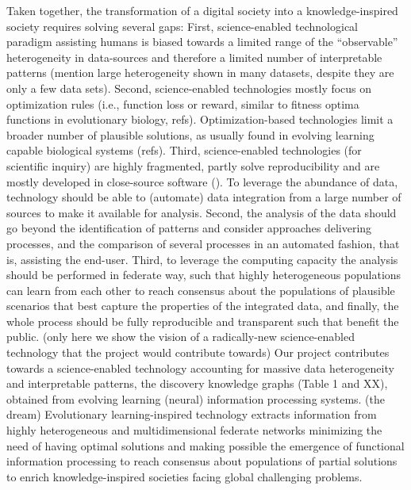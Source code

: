 \documentclass[11pt, a4paper]{article} %
\begin{document}
Taken together, the transformation of a digital society into a
knowledge-inspired society requires solving several gaps: First,
science-enabled technological paradigm assisting humans is biased
towards a limited range of the ``observable'' heterogeneity in
data-sources and therefore a limited number of interpretable patterns
(mention large heterogeneity shown in many datasets, despite they are
only a few data sets). Second, science-enabled technologies mostly
focus on optimization rules (i.e., function loss or reward, similar to
fitness optima functions in evolutionary biology,
refs). Optimization-based technologies limit a broader number of
plausible solutions, as usually found in evolving learning capable
biological systems (refs). Third, science-enabled technologies (for
scientific inquiry) are highly fragmented, partly solve
reproducibility and are mostly developed in close-source software
(\citep{Inhaber1977,Ioannidis2005,Fang2011,Gunther2018,Hardwicke2018,Mehrabi2019,Real2020}). To
leverage the abundance of data, technology should be able to
(automate) data integration from a large number of sources to make it
available for analysis. Second, the analysis of the data should go
beyond the identification of patterns and consider approaches
delivering processes, and the comparison of several processes in an
automated fashion, that is, assisting the end-user. Third, to leverage
the computing capacity the analysis should be performed in federate
way, such that highly heterogeneous populations can learn from each
other to reach consensus about the populations of plausible scenarios
that best capture the properties of the integrated data, and finally,
the whole process should be fully reproducible and transparent such
that benefit the public. (only here we show the vision of a
radically-new science-enabled technology that the project would
contribute towards) Our project contributes towards a science-enabled
technology accounting for massive data heterogeneity and interpretable
patterns, the discovery knowledge graphs (Table 1 and XX), obtained
from evolving learning (neural) information processing systems. (the
dream) Evolutionary learning-inspired technology extracts information
from highly heterogeneous and multidimensional federate networks
minimizing the need of having optimal solutions and making possible
the emergence of functional information processing to reach consensus
about populations of partial solutions to enrich knowledge-inspired
societies facing global challenging problems.
\end{document}
